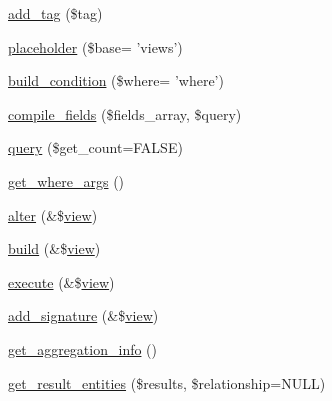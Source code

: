 \begin{DoxyCompactItemize}
\hyperlink{classviews__plugin__query__default_a7007bcb47f2ad6b03365c86cdad22b9c}{add\_\-tag} (\$tag)
\item 
\hyperlink{classviews__plugin__query__default_acd5a17da450663801421a3195400cb19}{placeholder} (\$base= 'views')
\item 
\hyperlink{classviews__plugin__query__default_aa135b39fb26099aaff9d4f6286a1ff66}{build\_\-condition} (\$where= 'where')
\item 
\hyperlink{classviews__plugin__query__default_a5de4d68210747a47374575b87e5ce9e1}{compile\_\-fields} (\$fields\_\-array, \$query)
\item 
\hyperlink{classviews__plugin__query__default_a64cd97fbcd03866806822ef01b9306ff}{query} (\$get\_\-count=FALSE)
\item 
\hyperlink{classviews__plugin__query__default_aefa64e1451878a790bb6e1ce589db28f}{get\_\-where\_\-args} ()
\item 
\hyperlink{classviews__plugin__query__default_aeff774a83f61292070594afc26f7a3e6}{alter} (\&\$\hyperlink{classview}{view})
\item 
\hyperlink{classviews__plugin__query__default_af0d7dc2d4f1ac47d99b153a7734e4a96}{build} (\&\$\hyperlink{classview}{view})
\item 
\hyperlink{classviews__plugin__query__default_a70d7f2ebdf1988941432d1c6ba311b03}{execute} (\&\$\hyperlink{classview}{view})
\item 
\hyperlink{classviews__plugin__query__default_a24253e8f12ec25b6a16413d6b5659547}{add\_\-signature} (\&\$\hyperlink{classview}{view})
\item 
\hyperlink{classviews__plugin__query__default_a07be1c437984cac29d608041e8378c2f}{get\_\-aggregation\_\-info} ()
\item 
\hyperlink{classviews__plugin__query__default_ad6e3fe94f3e287c1b8f2c7a9d567066d}{get\_\-result\_\-entities} (\$results, \$relationship=NULL)
\end{DoxyCompactItemize}
